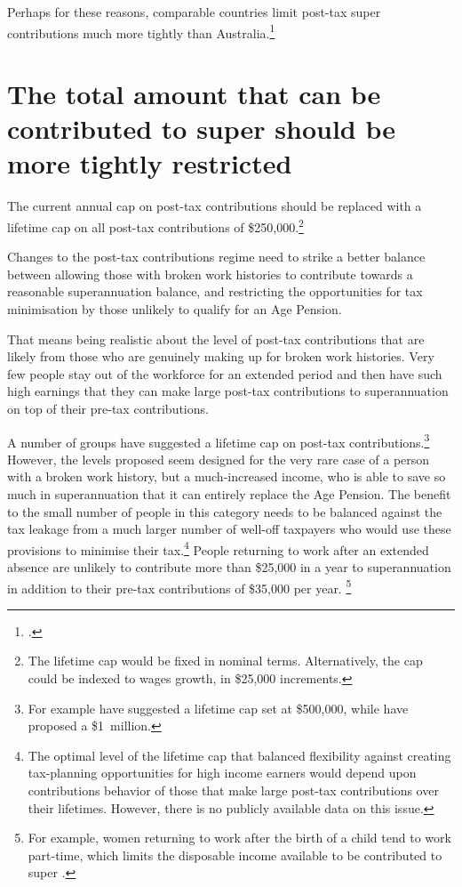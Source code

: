 Perhaps for these reasons, comparable countries limit post-tax super contributions much more tightly than Australia.\footcite[][8]{IndustrySuperAustralia2015-Nearly-half-Australians-not-have-comfortable-retirement}  

\section{The total amount that can be contributed to super should be more tightly restricted}\label{sec:SUPER-5-2}
The current annual cap on post-tax contributions should be replaced with a lifetime cap on all post-tax contributions of \$250,000.\footnote{The lifetime cap would be fixed in nominal terms. Alternatively, the cap could be indexed to wages growth, in \$25,000 increments.}  

Changes to the post-tax contributions regime need to strike a better balance between allowing those with broken work histories to contribute towards a reasonable superannuation balance, and restricting the opportunities for tax minimisation by those unlikely to qualify for an Age Pension.

That means being realistic about the level of post-tax contributions that are likely from those who are genuinely making up for broken work histories. Very few people stay out of the workforce for an extended period and then have such high earnings that they can make large post-tax contributions to superannuation on top of their pre-tax contributions. 

A number of groups have suggested a lifetime cap on post-tax contributions.\footnote{For example \textcite[][26]{RiceWarner2015SubmissionTaxWhitePaper} have suggested a lifetime cap set at \$500,000, while \textcite[][19]{ASFA2015TreasurySubmission} have proposed a \$1~million. }  However, the levels proposed seem designed for the very rare case of a person with a broken work history, but a much-increased income, who is able to save so much in superannuation that it can entirely replace the Age Pension. The benefit to the small number of people in this category needs to be balanced against the tax leakage from a much larger number of well-off taxpayers who would use these provisions to minimise their tax.\footnote{The optimal level of the lifetime cap that balanced flexibility against creating tax-planning opportunities for high income earners would depend upon contributions behavior of those that make large post-tax contributions over their lifetimes. However, there is no publicly available data on this issue.} 
People returning to work after an extended absence are unlikely to contribute more than \$25,000 in a year to superannuation in addition to their pre-tax contributions of \$35,000 per year.
\footnote{For example, women returning to work after the birth of a child tend to work part-time, which limits the disposable income available to be contributed to super \textcite[][222]{ProductivityCommission2009PaidParentalLeave}.}

